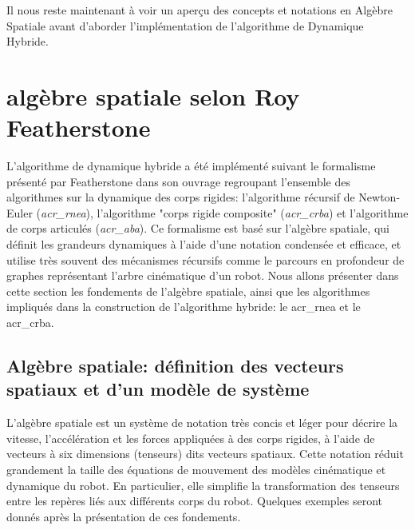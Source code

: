 \documentclass{report}
\begin{document}
Il nous reste maintenant à voir un aperçu des concepts et notations en Algèbre Spatiale avant d'aborder l'implémentation de l'algorithme de Dynamique Hybride.



\chapter{algèbre spatiale selon Roy Featherstone}


L'algorithme de dynamique hybride a été implémenté suivant le formalisme présenté par Featherstone dans son ouvrage \cite{Featherstone} regroupant l'ensemble des algorithmes sur la dynamique des corps rigides: l'algorithme récursif de Newton-Euler (\emph{\gls{acr_rnea}}), l'algorithme "corps rigide composite" (\emph{\gls{acr_crba}}) et l'algorithme de corps articulés (\emph{\gls{acr_aba}}). Ce formalisme est basé sur l'algèbre spatiale, qui définit les grandeurs dynamiques à l'aide d'une notation condensée et efficace, et utilise très souvent des mécanismes récursifs comme le parcours en profondeur de graphes représentant l'arbre cinématique d'un robot. Nous allons présenter dans cette section les fondements de l'algèbre spatiale, ainsi que les algorithmes impliqués dans la construction de l'algorithme hybride: le \gls{acr_rnea} et le \gls{acr_crba}.\\


\section{Algèbre spatiale: définition des vecteurs spatiaux et d'un modèle de système}

L'algèbre spatiale est un système de notation très concis et léger pour décrire la vitesse, l'accélération et les forces appliquées à des corps rigides, à l'aide de vecteurs à six dimensions (tenseurs) dits vecteurs spatiaux. Cette notation réduit grandement la taille des équations de mouvement des modèles cinématique et dynamique du robot. En particulier, elle simplifie la transformation des tenseurs entre les repères liés aux différents corps du robot. Quelques exemples seront donnés après la présentation de ces fondements.\\
\end{document}
